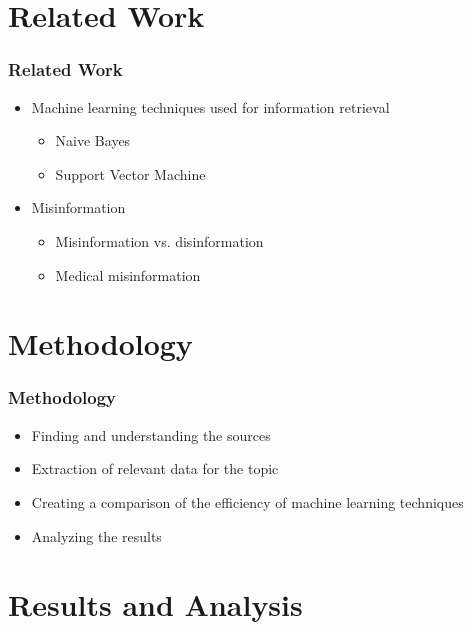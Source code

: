 \documentclass{beamer}
\begin{document}
\section{Related Work}

\begin{frame}[fragile=singleslide]\frametitle{Related Work}
\begin{itemize}[label=$\bullet$]
\item Machine learning techniques used for information retrieval
	\begin{itemize}[label=$\bullet$]
	\item Naive Bayes \cite{sha20mach}\cite{pod19mach}
	\item Support Vector Machine \cite{bar21health}\cite{chap22unmask}
	\end{itemize}
\item Misinformation
	\begin{itemize}[label=$\bullet$]
	\item Misinformation vs. disinformation\cite{gu20misinfo}
	\item Medical misinformation\cite{wa19sys}
	\end{itemize}
\end{itemize}
\end{frame}



\section{Methodology}

\begin{frame}[fragile=singleslide]\frametitle{Methodology}
\begin{itemize}[label=$\bullet$]
\item Finding and understanding the sources
\item Extraction of relevant data for the topic
\item Creating a comparison of the efficiency of machine learning techniques
\item Analyzing the results
\end{itemize}
\end{frame}

\section{Results and Analysis}
\end{document}
